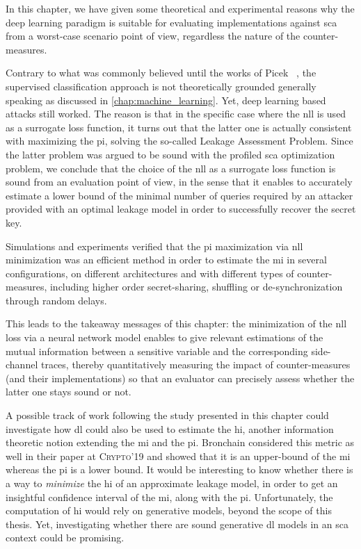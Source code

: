 In this chapter, we have given some theoretical and experimental reasons why the deep learning paradigm is suitable for evaluating implementations against \gls{sca} 
from a worst-case scenario point of view, regardless the nature of the counter-measures.

Contrary to what was commonly believed until the works of Picek \etal{}~\cite{picek_curse_2019}, the supervised classification approach is not theoretically grounded generally speaking as discussed in \autoref{chap:machine_learning}.
Yet, deep learning based attacks still worked.
The reason is that in the specific case where the \gls{nll} is used as a surrogate loss function, it turns out that the latter one is actually consistent with maximizing the \gls{pi}, solving the so-called Leakage Assessment Problem.
Since the latter problem was argued to be sound with the profiled \gls{sca} optimization problem, we conclude that the choice of the \gls{nll} as a surrogate loss function is sound from an evaluation point of view, in the sense that it enables to accurately estimate a lower bound of the minimal number of queries required by an attacker provided with an optimal leakage model in order to successfully recover the secret key.

Simulations and experiments verified that the \gls{pi} maximization via \gls{nll} minimization was an efficient method in order to estimate the \gls{mi} in several configurations, \ie{} on different architectures and with different types of counter-measures, including higher order secret-sharing, shuffling or de-synchronization through random delays.

This leads to the takeaway messages of this chapter: the minimization of the \gls{nll} loss via a neural network model enables to give relevant estimations of the mutual information between a sensitive variable and the corresponding side-channel traces, thereby quantitatively measuring the impact of counter-measures (and their implementations) so that an evaluator can precisely assess whether the latter one stays sound or not.

A possible track of work following the study presented in this chapter could investigate how \gls{dl} could also be used to estimate the \gls{hi}, another information theoretic notion extending the \gls{mi} and the \gls{pi}.
Bronchain \etal{} considered this metric as well in their paper at \textsc{Crypto}'19 and showed that it is an upper-bound of the \gls{mi} whereas the \gls{pi} is a lower bound.
It would be interesting to know whether there is a way to \emph{minimize} the \gls{hi} of an approximate leakage model, in order to get an insightful confidence interval of the \gls{mi}, along with the \gls{pi}.
Unfortunately, the computation of \gls{hi} would rely on generative models, beyond the scope of this thesis.
Yet, investigating whether there are sound generative \gls{dl} models in an \gls{sca} context could be promising.


